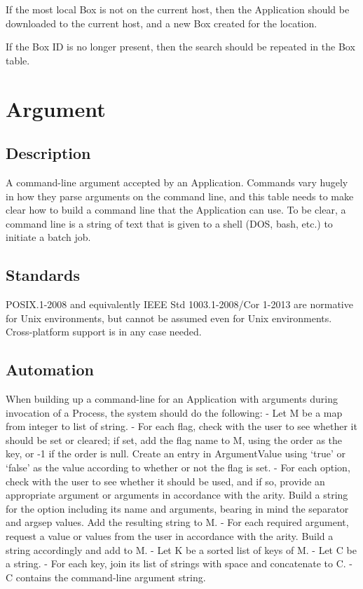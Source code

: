 If the most local Box is not on the current host, then the Application
should be downloaded to the current host, and a new Box created for the
location.

If the Box ID is no longer present, then the search should be repeated
in the Box table. \textbar{}

\section{Argument}\label{argument}

\subsection{Description}\label{description-1}

A command-line argument accepted by an Application. Commands vary hugely
in how they parse arguments on the command line, and this table needs to
make clear how to build a command line that the Application can use. To
be clear, a command line is a string of text that is given to a shell
(DOS, bash, etc.) to initiate a batch job.

\subsection{Standards}\label{standards-2}

POSIX.1-2008 and equivalently IEEE Std 1003.1-2008/Cor 1-2013 are
normative for Unix environments, but cannot be assumed even for Unix
environments. Cross-platform support is in any case needed.

\subsection{Automation}\label{automation-2}

When building up a command-line for an Application with arguments during
invocation of a Process, the system should do the following: - Let M be
a map from integer to list of string. - For each flag, check with the
user to see whether it should be set or cleared; if set, add the flag
name to M, using the order as the key, or -1 if the order is null.
Create an entry in ArgumentValue using `true' or `false' as the value
according to whether or not the flag is set. - For each option, check
with the user to see whether it should be used, and if so, provide an
appropriate argument or arguments in accordance with the arity. Build a
string for the option including its name and arguments, bearing in mind
the separator and argsep values. Add the resulting string to M. - For
each required argument, request a value or values from the user in
accordance with the arity. Build a string accordingly and add to M. -
Let K be a sorted list of keys of M. - Let C be a string. - For each
key, join its list of strings with space and concatenate to C. - C
contains the command-line argument string.

